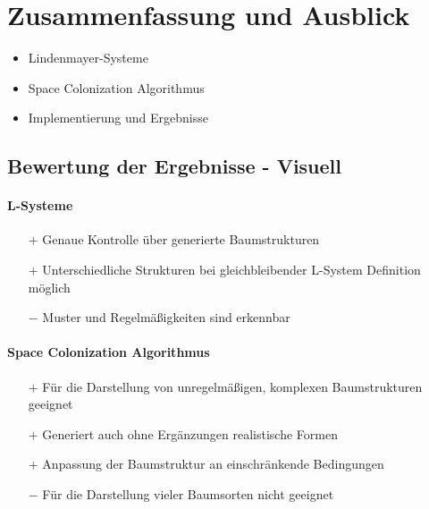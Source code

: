 \newpage
\slidetitle{}
\section{Zusammenfassung und Ausblick \\}


\begin{itemize}
	\item Lindenmayer-Systeme\\
	
	\item Space Colonization Algorithmus\\
	
	\item Implementierung und Ergebnisse
\end{itemize}


\newpage
{}
\subsection{Bewertung der Ergebnisse - Visuell\\}

\paragraph{L-Systeme\\}

\begin{itemize}
	\item[$+$] Genaue Kontrolle über generierte Baumstrukturen\\
	
	\item[$+$] Unterschiedliche Strukturen bei gleichbleibender L-System Definition möglich\\
	
	\item[$-$] Muster und Regelmäßigkeiten sind erkennbar
\end{itemize}




\newpage
\paragraph{Space Colonization Algorithmus\\}

\begin{itemize}
	\item[$+$] Für die Darstellung von unregelmäßigen, komplexen Baumstrukturen geeignet\\
	
	\item[$+$] Generiert auch ohne Ergänzungen realistische Formen\\
	
	\item[$+$] Anpassung der Baumstruktur an einschränkende Bedingungen\\
	
	\item[$-$] Für die Darstellung vieler Baumsorten nicht geeignet\\
\end{itemize}



